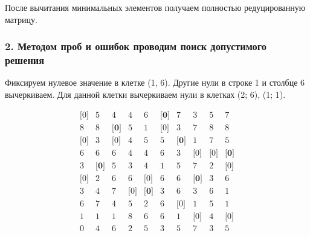 \documentclass[17pt]{extarticle}
\begin{document}
После вычитания минимальных элементов получаем полностью редуцированную матрицу.

\subsubsection*{2. Методом проб и ошибок проводим поиск допустимого решения}

Фиксируем нулевое значение в клетке (1, 6). Другие нули в строке 1 и столбце 6 вычеркиваем. Для данной клетки вычеркиваем нули в клетках (2; 6), (1; 1).

\[
    \begin{array}{*{10}{c}}
        \text{[0]} & 5            & 4            & 4          & 6            & \textbf{[0]} & 7            & 3            & 5          & 7            \\
        8          & 8            & \textbf{[0]} & 5          & 1            & \text{[0]}   & 3            & 7            & 8          & 8            \\
        \text{[0]} & 3            & \text{[0]}   & 4          & 5            & 5            & \textbf{[0]} & 1            & 7          & 5            \\
        6          & 6            & 6            & 4          & 4            & 6            & 3            & \text{[0]}   & \text{[0]} & \textbf{[0]} \\
        3          & \textbf{[0]} & 5            & 3          & 4            & 1            & 5            & 7            & 2          & \text{[0]}   \\
        \text{[0]} & 2            & 6            & 6          & \text{[0]}   & 6            & 6            & \textbf{[0]} & 3          & 6            \\
        3          & 4            & 7            & \text{[0]} & \textbf{[0]} & 3            & 6            & 3            & 6          & 1            \\
        6          & 7            & 4            & 5          & 2            & 6            & \text{[0]}   & 1            & 5          & 1            \\
        1          & 1            & 1            & 8          & 6            & 6            & 1            & \text{[0]}   & 4          & \text{[0]}   \\
        0          & 4            & 6            & 2          & 5            & 3            & 5            & 7            & 3          & 5            \\
    \end{array}
\]
\end{document}
